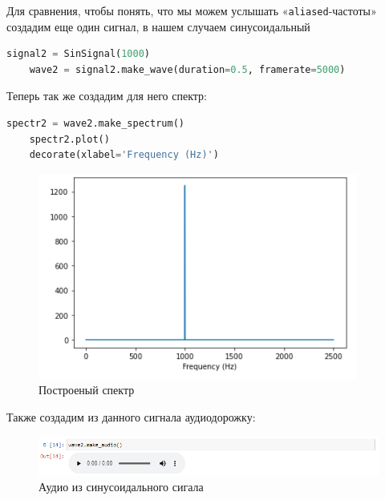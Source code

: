 \documentclass[a4paper]{article}
\begin{document}
            Для сравнения, чтобы понять, что мы можем услышать «\texttt{aliased}-частоты» создадим еще один сигнал, в нашем случаем синусоидальный
            
\begin{lstlisting}[language=Python, caption= Построение синусоидального сигнала]
    signal2 = SinSignal(1000)
    wave2 = signal2.make_wave(duration=0.5, framerate=5000)
\end{lstlisting}    
            
            Теперь так же создадим для него спектр:
            
\begin{lstlisting}[language=Python, caption= Построение спектра]
    spectr2 = wave2.make_spectrum()
    spectr2.plot()
    decorate(xlabel='Frequency (Hz)')
\end{lstlisting}               
            
            \begin{figure}[H]
                \centering
                \includegraphics[width=\textwidth]{ex_3_sin.png}
                \caption{Построеный спектр}
                \label{fig:ex_3_sin}
            \end{figure}
            
            Также создадим из данного сигнала аудиодорожку:
            
            \begin{figure}[H]
                \centering
                \includegraphics[width=\textwidth]{ex_3_sin_audio.png}
                \caption{Аудио из синусоидального сигала}
                \label{fig:ex_3_sin_audio}
            \end{figure}
            
\end{document}

